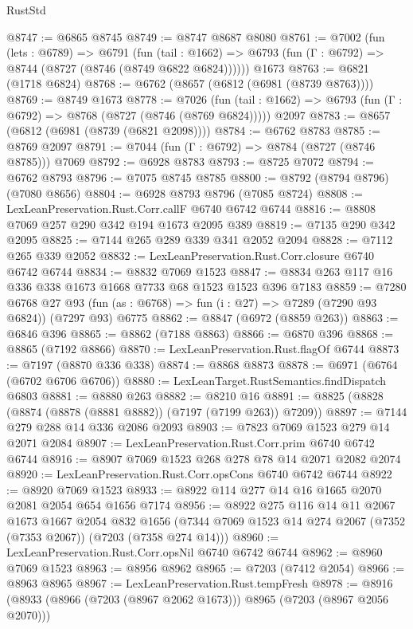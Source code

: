 \begin{lexlean}{RustStd}
\begin{coremodule}
{\begin{coremodule}
{{{{{{{{{{{{{{{{{{{{{{{{{{{{{{{{{{{{{{{{{{{{@8747 := @6865 @8745
@8749 := @8747 @8687 @8080
@8761 := @7002
    (fun (lets : @6789) =>
    @6791
      (fun (tail : @1662) => @6793 (fun (Γ : @6792) => @8744 (@8727 (@8746 (@8749 @6822 @6824))))))
    @1673
@8763 := @6821 (@1718 @6824)
@8768 := @6762 (@8657 (@6812 (@6981 (@8739 @8763))))
@8769 := @8749 @1673
@8778 := @7026
    (fun (tail : @1662) => @6793 (fun (Γ : @6792) => @8768 (@8727 (@8746 (@8769 @6824)))))
    @2097
@8783 := @8657 (@6812 (@6981 (@8739 (@6821 @2098))))
@8784 := @6762 @8783
@8785 := @8769 @2097
@8791 := @7044 (fun (Γ : @6792) => @8784 (@8727 (@8746 @8785))) @7069
@8792 := @6928 @8783
@8793 := @8725 @7072
@8794 := @6762 @8793
@8796 := @7075 @8745 @8785
@8800 := @8792 (@8794 @8796) (@7080 @8656)
@8804 := @6928 @8793 @8796 (@7085 @8724)
@8808 := LexLeanPreservation.Rust.Corr.callF @6740 @6742 @6744
@8816 := @8808 @7069 @257 @290 @342 @194 @1673 @2095 @389
@8819 := @7135 @290 @342 @2095
@8825 := @7144 @265 @289 @339 @341 @2052 @2094
@8828 := @7112 @265 @339 @2052
@8832 := LexLeanPreservation.Rust.Corr.closure @6740 @6742 @6744
@8834 := @8832 @7069 @1523
@8847 := @8834 @263 @117 @16 @336 @338 @1673 @1668 @7733 @68 @1523 @1523 @396 @7183
@8859 := @7280
    @6768
    @27
    @93
    (fun (as : @6768) => fun (i : @27) => @7289 (@7290 @93 @6824))
    (@7297 @93)
    @6775
@8862 := @8847 (@6972 (@8859 @263))
@8863 := @6846 @396
@8865 := @8862 (@7188 @8863)
@8866 := @6870 @396
@8868 := @8865 (@7192 @8866)
@8870 := LexLeanPreservation.Rust.flagOf @6744
@8873 := @7197 (@8870 @336 @338)
@8874 := @8868 @8873
@8878 := @6971 (@6764 (@6702 @6706 @6706))
@8880 := LexLeanTarget.RustSemantics.findDispatch @6803
@8881 := @8880 @263
@8882 := @8210 @16
@8891 := @8825 (@8828 (@8874 (@8878 (@8881 @8882)) (@7197 (@7199 @263)) @7209))
@8897 := @7144 @279 @288 @14 @336 @2086 @2093
@8903 := @7823 @7069 @1523 @279 @14 @2071 @2084
@8907 := LexLeanPreservation.Rust.Corr.prim @6740 @6742 @6744
@8916 := @8907 @7069 @1523 @268 @278 @78 @14 @2071 @2082 @2074
@8920 := LexLeanPreservation.Rust.Corr.opsCons @6740 @6742 @6744
@8922 := @8920 @7069 @1523
@8933 := @8922 @114 @277 @14 @16 @1665 @2070 @2081 @2054 @654 @1656 @7174
@8956 := @8922
    @275
    @116
    @14
    @11
    @2067
    @1673
    @1667
    @2054
    @832
    @1656
    (@7344 @7069 @1523 @14 @274 @2067 (@7352 (@7353 @2067)) (@7203 (@7358 @274 @14)))
@8960 := LexLeanPreservation.Rust.Corr.opsNil @6740 @6742 @6744
@8962 := @8960 @7069 @1523
@8963 := @8956 @8962
@8965 := @7203 (@7412 @2054)
@8966 := @8963 @8965
@8967 := LexLeanPreservation.Rust.tempFresh
@8978 := @8916 (@8933 (@8966 (@7203 (@8967 @2062 @1673))) @8965 (@7203 (@8967 @2056 @2070)))
}}}}}}}}}}}}}}}}}}}}}}}}}}}}}}}}}}}}}}}}}}}}
\end{coremodule}}
\end{coremodule}
\end{lexlean}
